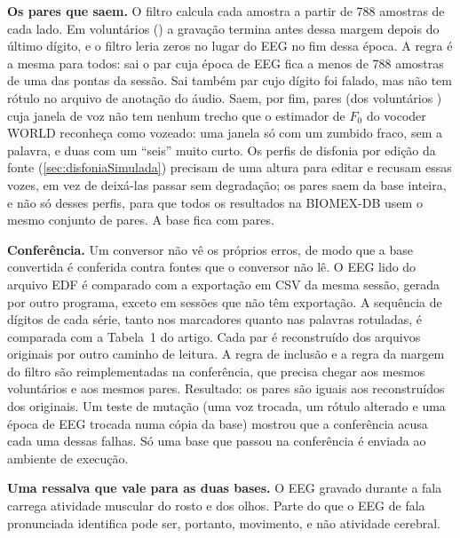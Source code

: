 		\par \textbf{Os pares que saem.} O filtro calcula cada amostra a partir de 788 amostras de cada lado. Em  voluntários () a gravação termina antes dessa margem depois do último dígito, e o filtro leria zeros no lugar do \ac{EEG} no fim dessa época. A regra é a mesma para todos: sai o par cuja época de \ac{EEG} fica a menos de 788 amostras de uma das pontas da sessão. Sai também  par cujo dígito foi falado, mas não tem rótulo no arquivo de anotação do áudio. Saem, por fim,  pares (dos voluntários ) cuja janela de voz não tem nenhum trecho que o estimador de $F_0$ do vocoder WORLD \cite{morise2016world} reconheça como vozeado: uma janela só com um zumbido fraco, sem a palavra, e duas com um ``seis'' muito curto. Os perfis de disfonia por edição da fonte (\autoref{sec:disfoniaSimulada}) precisam de uma altura para editar e recusam essas vozes, em vez de deixá-las passar sem degradação; os pares saem da base inteira, e não só desses perfis, para que todos os resultados na BIOMEX-DB usem o mesmo conjunto de pares. A base fica com  pares.

		\par \textbf{Conferência.} Um conversor não vê os próprios erros, de modo que a base convertida é conferida contra fontes que o conversor não lê. O \ac{EEG} lido do arquivo EDF é comparado com a exportação em CSV da mesma sessão, gerada por outro programa, exceto em  sessões que não têm exportação. A sequência de dígitos de cada série, tanto nos marcadores quanto nas palavras rotuladas, é comparada com a Tabela~1 do artigo. Cada par é reconstruído dos arquivos originais por outro caminho de leitura. A regra de inclusão e a regra da margem do filtro são reimplementadas na conferência, que precisa chegar aos mesmos voluntários e aos mesmos pares. Resultado: os  pares são iguais aos reconstruídos dos originais. Um teste de mutação (uma voz trocada, um rótulo alterado e uma época de \ac{EEG} trocada numa cópia da base) mostrou que a conferência acusa cada uma dessas falhas. Só uma base que passou na conferência é enviada ao ambiente de execução.

		\par \textbf{Uma ressalva que vale para as duas bases.} O \ac{EEG} gravado durante a fala carrega atividade muscular do rosto e dos olhos. Parte do que o \ac{EEG} de fala pronunciada identifica pode ser, portanto, movimento, e não atividade cerebral.

